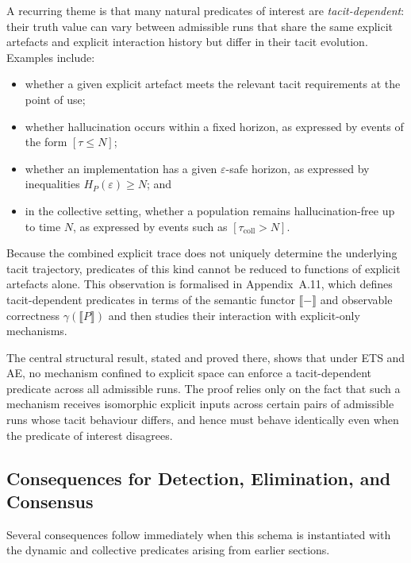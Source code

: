 A recurring theme is that many natural predicates of interest are \emph{tacit-dependent}: their truth value can vary between admissible runs that share the same explicit artefacts and explicit interaction history but differ in their tacit evolution. Examples include:
\begin{itemize}
  \item whether a given explicit artefact meets the relevant tacit requirements at the point of use;
  \item whether hallucination occurs within a fixed horizon, as expressed by events of the form $[\tau \leq N]$;
  \item whether an implementation has a given $\varepsilon$-safe horizon, as expressed by inequalities $H_P(\varepsilon) \geq N$; and
  \item in the collective setting, whether a population remains hallucination-free up to time $N$, as expressed by events such as $[\tau_{\mathrm{coll}} > N]$.
\end{itemize}
Because the combined explicit trace does not uniquely determine the underlying tacit trajectory, predicates of this kind cannot be reduced to functions of explicit artefacts alone. This observation is formalised in Appendix~A.11, which defines tacit-dependent predicates in terms of the semantic functor $\llbracket - \rrbracket$ and observable correctness $\gamma(\llbracket P \rrbracket)$ and then studies their interaction with explicit-only mechanisms.

The central structural result, stated and proved there, shows that under ETS and AE, no mechanism confined to explicit space can enforce a tacit-dependent predicate across all admissible runs. The proof relies only on the fact that such a mechanism receives isomorphic explicit inputs across certain pairs of admissible runs whose tacit behaviour differs, and hence must behave identically even when the predicate of interest disagrees.

\subsection{Consequences for Detection, Elimination, and Consensus}

Several consequences follow immediately when this schema is instantiated with the dynamic and collective predicates arising from earlier sections.

